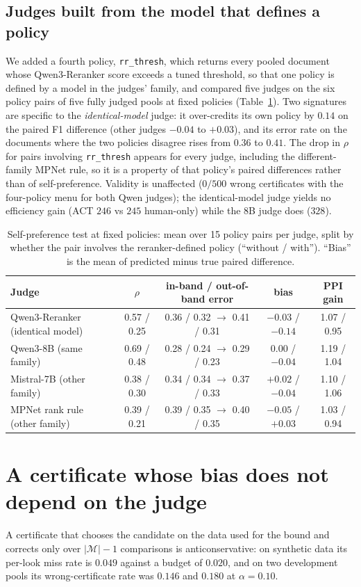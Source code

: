 \documentclass{article}
\begin{document}
\subsection{Judges built from the model that defines a policy}\label{sec:selfpref}
We added a fourth policy, \texttt{rr\_thresh}, which returns every pooled document whose Qwen3-Reranker score exceeds a tuned threshold, so that one policy is defined by a model in the judges' family, and compared five judges on the six policy pairs of five fully judged pools at fixed policies (Table~\ref{tab:selfpref}). Two signatures are specific to the \emph{identical-model} judge: it over-credits its own policy by $0.14$ on the paired F1 difference (other judges $-0.04$ to $+0.03$), and its error rate on the documents where the two policies disagree rises from $0.36$ to $0.41$. The drop in $\rho$ for pairs involving \texttt{rr\_thresh} appears for every judge, including the different-family MPNet rule, so it is a property of that policy's paired differences rather than of self-preference. Validity is unaffected ($0/500$ wrong certificates with the four-policy menu for both Qwen judges); the identical-model judge yields no efficiency gain (ACT $246$ vs $245$ human-only) while the 8B judge does ($328$).

\begin{table}[t]\centering\footnotesize
\caption{Self-preference test at fixed policies: mean over 15 policy pairs per judge, split by whether the pair involves the reranker-defined policy (``without / with''). ``Bias'' is the mean of predicted minus true paired difference.}\label{tab:selfpref}
\begin{tabular}{lcccc}\toprule
Judge & $\rho$ & in-band / out-of-band error & bias & PPI gain\\\midrule
Qwen3-Reranker (identical model) & 0.57 / 0.25 & 0.36 / 0.32 $\to$ 0.41 / 0.31 & $-0.03$ / $\mathbf{-0.14}$ & 1.07 / 0.95\\
Qwen3-8B (same family) & 0.69 / 0.48 & 0.28 / 0.24 $\to$ 0.29 / 0.23 & $0.00$ / $-0.04$ & 1.19 / 1.04\\
Mistral-7B (other family) & 0.38 / 0.30 & 0.34 / 0.34 $\to$ 0.37 / 0.33 & $+0.02$ / $-0.04$ & 1.10 / 1.06\\
MPNet rank rule (other family) & 0.39 / 0.21 & 0.39 / 0.35 $\to$ 0.40 / 0.35 & $-0.05$ / $+0.03$ & 1.03 / 0.94\\\bottomrule
\end{tabular}
\end{table}

\section{A certificate whose bias does not depend on the judge}\label{sec:valid}
A certificate that chooses the candidate on the data used for the bound and corrects only over $|\mathcal M|-1$ comparisons is anticonservative: on synthetic data its per-look miss rate is $0.049$ against a budget of $0.020$, and on two development pools its wrong-certificate rate was $0.146$ and $0.180$ at $\alpha=0.10$.
\end{document}
